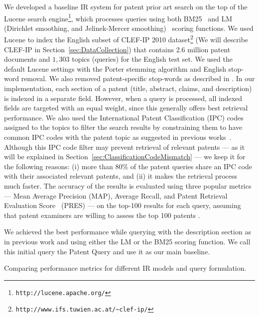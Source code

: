 We developed a baseline IR system for patent prior art search on the top of
the Lucene search engine\footnote{\texttt{http://lucene.apache.org/}}, which processes queries using both BM25~\citep{Robertson1993} and LM (Dirichlet
smoothing, and Jelinek-Mercer smoothing)~\citep{zhai2004study} scoring functions. %
We used Lucene to index the English subset of CLEF-IP 2010 dataset\footnote{\texttt{http://www.ifs.tuwien.ac.at/\textasciitilde{}clef-ip/}} 
(We will describe CLEF-IP in Section~\ref{sec:DataCollection}) that contains 2.6 million patent documents and $1,303$ topics (queries) for the English test set.
We used the default Lucene settings with the Porter stemming algorithm \cite{Porter1980} and English stop-word removal. 
We also removed patent-specific stop-words as described in \cite{magdy2012toward}.
In
our implementation, each section of a patent (title, abstract, claims,
and description) is indexed in a separate field. However, when a query 
is processed, all indexed fields are targeted with an equal weight, since this generally
offers best retrieval performance. We also used the International
Patent Classification (IPC) codes assigned to the topics to filter
the search results by constraining them to have common IPC codes with
the patent topic as suggested in previous works~\citep{lopez2010patatras}.
Although this IPC code filter may prevent retrieval of relevant patents 
--- as it will be explained in Section~\ref{sec:ClassificationCodeMismatch} --- we
keep it for the following reasons: (i) more than 80\%
of the patent queries share an IPC code with their associated relevant
patents, and (ii) it makes the retrieval process much faster. The accuracy of the results is evaluated 
using three popular metrics --- Mean Average Precision (MAP), Average Recall, and Patent Retrieval Evaluation 
Score~\citep{magdy2012toward} (PRES) --- on the top-100 results for each query, assuming that patent examiners 
are willing to assess the top 100 patents \citep{joho2010survey}. 

We achieved the best performance while querying with the description
section as in previous work \citep{xue2009transforming} and using
either the LM or the BM25 scoring function. 
We call this initial 
query the Patent Query and use it as our main baseline.
\begin{savenotes}
\begin{table*}[t!]
  \begin{center}
  \caption{Comparing performance metrics for different IR models and query formulation.}
   
  \label{tab:IRmodels_Sections}
  \end{center}  
\end{table*}
\end{savenotes}

